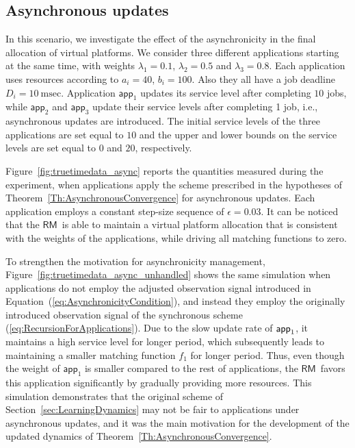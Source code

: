 \documentclass[letter,11pt]{article}
\begin{document}
\subsection{Asynchronous updates}

In this scenario, we investigate the effect of the asynchronicity in the final allocation of virtual platforms. We consider three different applications starting at the same time, with weights $\lambda_{1}=0.1$, $\lambda_{2}=0.5$ and $\lambda_{3}=0.8$. Each application uses resources according to $a_i\!\!=40$, $b_i\!\!=100$. Also they all have a job deadline $D_i=10\ \text{msec}$. Application $\mathsf{app}_1$ updates its service level after completing $10$ jobs, while $\mathsf{app}_2$ and $\mathsf{app}_3$ update their service levels after completing 1 job, i.e., asynchronous updates are introduced. The initial service levels of the three applications are set equal to $10$ and the upper and lower bounds on the service levels are set equal to $0$ and $20$, respectively. 

Figure~\ref{fig:truetimedata_async} reports the quantities measured during the experiment, when applications apply the scheme prescribed in the hypotheses of Theorem~\ref{Th:AsynchronousConvergence} for asynchronous updates. Each application employs a constant step-size sequence of $\epsilon = 0.03$.  It can be noticed that the {$\mathsf{RM}$}\ is able to maintain a virtual platform allocation that is consistent with the weights of the applications, while driving all matching functions to zero. 

To strengthen the motivation for asynchronicity management, Figure~\ref{fig:truetimedata_async_unhandled} shows the same simulation when applications do not employ the adjusted observation signal introduced in Equation~(\ref{eq:AsynchronicityCondition}), and instead they employ the originally introduced observation signal of the synchronous scheme (\ref{eq:RecursionForApplications}). Due to the slow update rate of ${\sf app}_1$, it maintains a high service level for longer period, which subsequently leads to maintaining a smaller matching function $f_1$ for longer period. Thus, even though the weight of $\mathsf{app}_1$ is smaller compared to the rest of applications, the {$\mathsf{RM}$}\ favors this application significantly by gradually providing more resources. This simulation demonstrates that the original scheme of Section~\ref{sec:LearningDynamics} may not be fair to applications under asynchronous updates, and it was the main motivation for the development of the updated dynamics of Theorem~\ref{Th:AsynchronousConvergence}.
\end{document}
